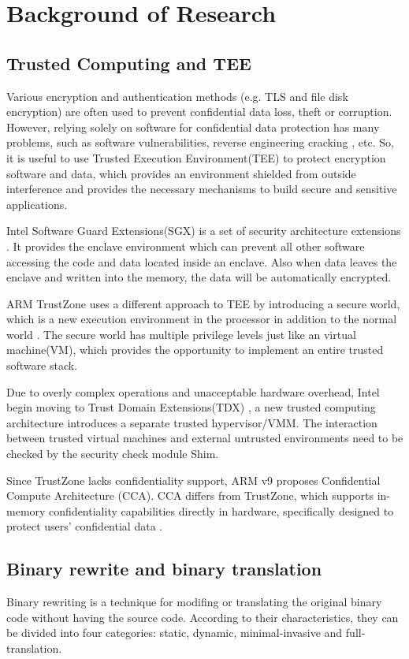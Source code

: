 \section{Background of Research}
\subsection{Trusted Computing and TEE}
Various encryption and authentication methods (e.g. TLS and file disk encryption)
are often used to prevent confidential data loss, theft or corruption.
However, relying solely on software for confidential data protection has many problems,
such as software vulnerabilities, reverse engineering cracking \cite{Zimba2021ARC}, etc.
So, it is useful to use Trusted Execution Environment(TEE) to protect encryption software
and data, which provides an environment shielded from outside interference and provides
the necessary mechanisms to build secure and sensitive applications.

Intel Software Guard Extensions(SGX) is a set of security architecture extensions 
\cite{McKeen2013InnovativeIA}.
It provides the enclave environment which can prevent all other software accessing the code
and data located inside an enclave. Also when data leaves the enclave and written into
the memory, the data will be automatically encrypted.

ARM TrustZone uses a different approach to TEE by introducing a secure world,
which is a new execution environment in the processor in addition to the normal world
\cite{Mukhtar2019ArchitecturesFS}. The secure world has multiple privilege levels just
like an virtual machine(VM), which provides the opportunity to implement an entire
trusted software stack.

Due to overly complex operations and unacceptable hardware overhead, Intel begin moving to
Trust Domain Extensions(TDX) \cite{Sahita2021SecurityAO, Sardar2021DemystifyingAI}, a new
trusted computing architecture introduces a separate trusted hypervisor/VMM. The interaction
between trusted virtual machines and external untrusted environments need to be checked by the
security check module Shim.

Since TrustZone lacks confidentiality support, ARM v9 proposes Confidential Compute Architecture (CCA).
CCA differs from TrustZone, which supports in-memory confidentiality capabilities directly in hardware,
specifically designed to protect users' confidential data \cite{CCA}.

\subsection{Binary rewrite and binary translation}
Binary rewriting is a technique for modifing or translating the original binary code
without having the source code. According to their characteristics, they can be divided
into four categories: static, dynamic, minimal-invasive and full-translation.

